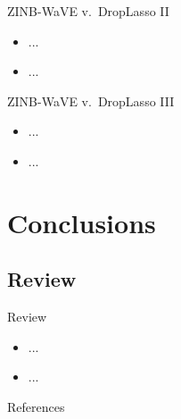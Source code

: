 \documentclass{beamer}
\begin{document}
\begin{frame}{ZINB-WaVE v.~DropLasso II}

\begin{itemize}
  \itemsep10pt
  \item ...
  \item ...
\end{itemize}

\end{frame}


\begin{frame}{ZINB-WaVE v.~DropLasso III}

\begin{itemize}
  \itemsep10pt
  \item ...
  \item ...
\end{itemize}

\end{frame}

\section{Conclusions}
\subsection{Review}

\begin{frame}{Review}

\begin{itemize}
  \itemsep10pt
  \item ...
  \item ...
\end{itemize}

\end{frame}


\setbeamercovered{}
\beamerdefaultoverlayspecification{}

\begin{frame}[c,allowframebreaks]{References}

\small

\nocite{*}

\itemize

\end{frame}

\end{document}
